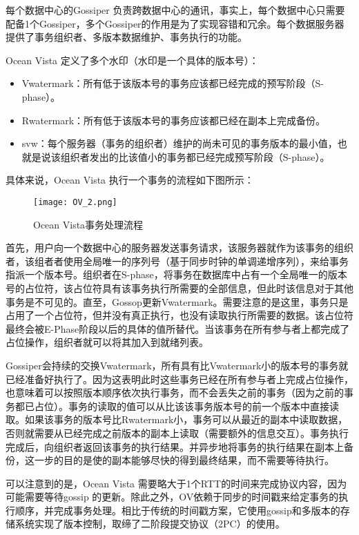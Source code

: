 每个数据中心的Gossiper 负责跨数据中心的通讯，事实上，每个数据中心只需要配备1个Gossiper，多个Gossiper的作用是为了实现容错和冗余。每个数据服务器提供了事务组织者、多版本数据维护、事务执行的功能。

Ocean Vista 定义了多个水印（水印是一个具体的版本号）：

\begin{itemize}
\item Vwatermark：所有低于该版本号的事务应该都已经完成的预写阶段（S-phase）。
\item Rwatermark：所有低于该版本号的事务应该都已经在副本上完成备份。
\item svw：每个服务器（事务的组织者）维护的尚未可见的事务版本的最小值，也就是说该组织者发出的比该值小的事务都已经完成预写阶段（S-phase）。
\end{itemize}

具体来说，Ocean Vista 执行一个事务的流程如下图所示：

\begin{figure}[htb]
  \centering
  \texttt{[image: OV\_2.png]}
  \caption{Ocean Vista事务处理流程}
  \label{fig:badge}
\end{figure}

首先，用户向一个数据中心的服务器发送事务请求，该服务器就作为该事务的组织者，该组者者使用全局唯一的序列号（基于同步时钟的单调递增序列），来给事务指派一个版本号。组织者在S-phase，将事务在数据库中占有一个全局唯一的版本号的占位符，该占位符具有该事务执行所需要的全部信息，但此时该信息对于其他事务是不可见的。直至，Gossop更新Vwatermark。需要注意的是这里，事务只是占用了一个占位符，但并没有真正执行，也没有读取执行所需要的数据。该占位符最终会被E-Phase阶段以后的具体的值所替代。当该事务在所有参与者上都完成了占位操作，组织者就可以将其加入到就绪列表。

Gossiper会持续的交换Vwatermark，所有具有比Vwatermark小的版本号的事务就已经准备好执行了。因为这表明此时这些事务已经在所有参与者上完成占位操作，也意味着可以按照版本顺序依次执行事务，而不会丢失之前的事务（因为之前的事务都已占位）。事务的读取的值可以从比该该事务版本号的前一个版本中直接读取。如果该事务的版本号比Rwatermark小，事务可以从最近的副本中读取数据，否则就需要从已经完成之前版本的副本上读取（需要额外的信息交互）。事务执行完成后，向组织者返回该事务的执行结果。并异步地将事务的执行结果在副本上备份，这一步的目的是使的副本能够尽快的得到最终结果，而不需要等待执行。

可以注意到的是，Ocean Vista 需要略大于1个RTT的时间来完成协议内容，因为可能需要等待gossip 的更新。除此之外，OV依赖于同步的时间戳来给定事务的执行顺序，并完成事务处理。相比于传统的时间戳方案，它使用gossip和多版本的存储系统实现了版本控制，取缔了二阶段提交协议（2PC）的使用。

